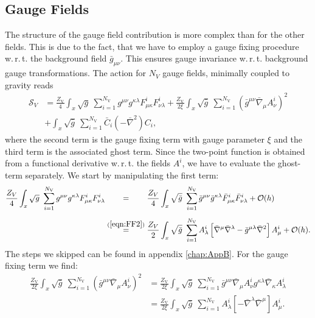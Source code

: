 \subsection{Gauge Fields}  
\vspace{-0.35cm}

The structure of the gauge field contribution is more complex than for the other fields. This is due to the fact, that we have to employ a gauge fixing procedure w.\,r.\,t. the background field $\bar{g}_{\mu\nu}$. This ensures gauge invariance w.\,r.\,t. background gauge transformations. The action for $N_V$ gauge fields, minimally coupled to gravity reads
\begin{equation}
\begin{aligned}
\mathcal{S}_{V} &= \frac{Z_{\text{V}}}{4}\int_x \sqrt{g} \ \sum\limits_{i=1}^{N_{\text{V}}} g^{\mu\nu}g^{\kappa\lambda}F^{i}_{\mu\kappa}F^{i}_{\nu\lambda}  
		+ \frac{Z_{\text{V}}}{2\xi}\int_x \sqrt{\bar{g}} \ \sum\limits_{i=1}^{N_{\text{V}}} \left(\bar{g}^{\mu\nu}\bar{\nabla}_{\mu}A_{\nu}^{i}\right)^2\\
		&+\int_x \sqrt{\bar{g}} \ \sum\limits_{i=1}^{N_{\text{V}}} \bar{C}_i(-\bar{\nabla}^2)C_i, 
\end{aligned}
\end{equation}
where the second term is the gauge fixing term with gauge parameter $\xi$ and the third term is the associated ghost term. Since the two-point function is obtained from a functional derivative w.\,r.\,t. the fields $A^{i}$, we have to evaluate the ghost-term separately. We start by manipulating the first term:
\begin{equation}
\begin{aligned}
\frac{Z_V}{4}\int_x \sqrt{g} \ \sum\limits_{i=1}^{N_{\text{V}}} g^{\mu\nu}g^{\kappa\lambda}F^{i}_{\mu\kappa}F^{i}_{\nu\lambda} &\overset{\phantom{(\mathrm{\ref{eqn:FF2}})}}{=}  \frac{Z_{V}}{4} \int_x \sqrt{\bar{g}} \ \sum\limits_{i=1}^{N_{\text{V}}} \bar{g}^{\mu\nu}\bar{g}^{\kappa\lambda}\bar{F}^{i}_{\mu\kappa}\bar{F}^{i}_{\nu\lambda} + \mathcal{O}(h) \\[5pt]
&\overset{(\mathrm{\ref{eqn:FF2}})}{=} \frac{Z_{V}}{2} \int_x \sqrt{\bar{g}} \ \sum\limits_{i=1}^{N_{\text{V}}} A_{\lambda}^{i}\left[ \bar{\nabla}^{\mu}\bar{\nabla}^{\lambda} - \bar{g}^{\mu\lambda}\bar{\nabla}^2\right]A_{\mu}^{i} + \mathcal{O}(h).
\end{aligned}
\end{equation}
\newpage
The steps we skipped can be found in appendix \ref{chap:AppB}. For the gauge fixing term we find:
\begin{equation}
\begin{aligned}
\frac{Z_{\text{V}}}{2\xi}\int_x \sqrt{\bar{g}} \ \sum\limits_{i=1}^{N_{\text{V}}} \left(\bar{g}^{\mu\nu}\bar{\nabla}_{\mu}A_{\nu}^{i}\right)^2 
	&= \frac{Z_{\text{V}}}{2\xi}\int_x \sqrt{\bar{g}} \ \sum\limits_{i=1}^{N_{\text{V}}} \bar{g}^{\mu\nu}\bar{\nabla}_{\mu}A_{\nu}^{i}g^{\kappa\lambda}\bar{\nabla}_{\kappa}A_{\lambda}^{i} \\[5pt]
	&= \frac{Z_{\text{V}}}{2\xi}\int_x \sqrt{\bar{g}} \ \sum\limits_{i=1}^{N_{\text{V}}} A_{\lambda}^{i}\left[-\bar{\nabla}^{\lambda}\bar{\nabla}^{\mu}\right]A_{\mu}^{i}. 
\end{aligned}	
\end{equation}
